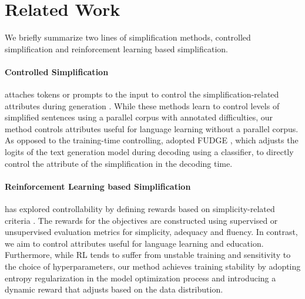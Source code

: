 \section{Related Work}
We briefly summarize two lines of simplification methods, controlled simplification and reinforcement learning based simplification. %


\paragraph{Controlled Simplification} attaches tokens or prompts to the input %
to control the simplification-related attributes during generation \cite{yang-etal-2023-tailor,agrawal-carpuat-2023-controlling, sheang-saggion-2021-controllable,martin-etal-2020-controllable, martin-etal-2022-muss, scarton-specia-2018-learning, chi-etal-2023-learning}. 
While these methods learn to control levels of simplified sentences using a parallel corpus with annotated difficulties, our method controls attributes useful for language learning without a parallel corpus. 
As opposed to the training-time controlling, \citet{kew-ebling-2022-target} adopted FUDGE \cite{yang-klein-2021-fudge}, which adjusts the logits of the text generation model during decoding using a classifier, to directly control the attribute of the simplification in the decoding time. 


\paragraph{Reinforcement Learning based Simplification} has explored
controllability by defining rewards based on simplicity-related criteria %
\cite{zhang-lapata-2017-sentence,guo-etal-2018-dynamic,nakamachi-etal-2020-text,laban-etal-2021-keep}. The rewards for the objectives are constructed using supervised or unsupervised evaluation metrics for simplicity, adequacy and fluency. 
In contrast, we aim to control attributes useful for language learning and education. 
Furthermore, while RL tends to suffer from unstable training and sensitivity to the choice of hyperparameters, our method achieves training stability by adopting entropy regularization in the model optimization process and introducing a dynamic reward that adjusts based on the data distribution.   

